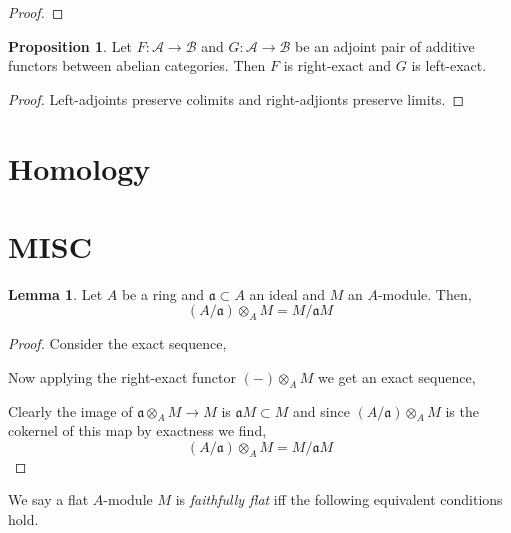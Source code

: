 \documentclass[12pt]{article}
\renewcommand{\a}{\mathfrak{a}}
\newcommand{\A}{\mathcal{A}}
\newcommand{\B}{\mathcal{B}}
\theoremstyle{remark}
\theoremstyle{definition}
\newtheorem{lemma}[theorem]{Lemma}
\newtheorem{proposition}[theorem]{Proposition}
\newenvironment{definition}[1][Definition:]{\begin{trivlist}
\item[\hskip \labelsep {\bfseries #1}]}{\end{trivlist}}
\begin{document}
\begin{proof}

\end{proof}

\begin{proposition}
Let $F : \A \to \B$ and $G : \A \to \B$ be an adjoint pair of additive functors between abelian categories. Then $F$ is right-exact and $G$ is left-exact.
\end{proposition}

\begin{proof}
Left-adjoints preserve colimits and right-adjionts preserve limits.
\end{proof}

\section{Homology}

\section{MISC}

\begin{lemma} 
Let $A$ be a ring and $\a \subset A$ an ideal and $M$ an $A$-module. Then,
\[ (A / \a) \otimes_A M = M / \a M \]
\end{lemma}

\begin{proof}
Consider the exact sequence,
\begin{center}
\end{center}
Now applying the right-exact functor $(-) \otimes_A M$ we get an exact sequence,
\begin{center}
\end{center}
Clearly the image of $\a \otimes_A M \to M$ is $\a M \subset M$ and since $(A / \a) \otimes_A M$ is the cokernel of this map by exactness we find,
\[ (A / \a) \otimes_A M = M / \a M \]
\end{proof}

\begin{definition}
We say a flat $A$-module $M$ is \textit{faithfully flat} iff the following equivalent conditions hold.
\end{definition}
\end{document}
